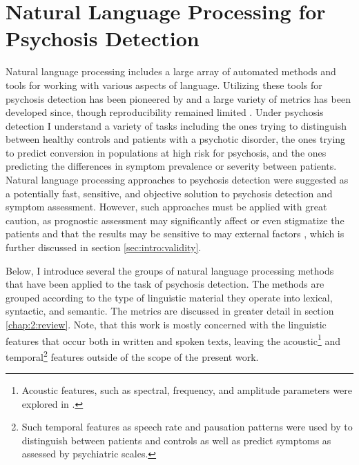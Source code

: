 \section{Natural Language Processing for Psychosis Detection}

Natural language processing includes a large array of automated methods and tools for working with various aspects of language. Utilizing these tools for psychosis detection has been pioneered by \citet{elvevaag2007quantifying} and a large variety of metrics has been developed since, though reproducibility remained limited \citep{hitczenko2021understanding, parola2022speech, fradkin2023theory}. Under psychosis detection I understand a variety of tasks including the ones trying to distinguish between healthy controls and patients with a psychotic disorder, the ones trying to predict conversion in populations at high risk for psychosis, and the ones predicting the differences in symptom prevalence or severity between patients. Natural language processing approaches to psychosis detection were suggested as a potentially fast, sensitive, and objective solution to psychosis detection and symptom assessment. However, such approaches must be applied with great caution, as  prognostic assessment may significantly affect or even stigmatize the patients and that the results may be sensitive to may external factors \citep{just2023validation}, which is further discussed in section \ref{sec:intro:validity}.

Below, I introduce several the groups of natural language processing methods that have been applied to the task of psychosis detection. The methods are grouped according to the type of linguistic material they operate into lexical, syntactic, and semantic. The metrics are discussed in greater detail in section \ref{chap:2:review}. Note, that this work is mostly concerned with the linguistic features that occur both in written and spoken texts, leaving the acoustic\footnote{Acoustic features, such as spectral, frequency, and amplitude parameters were explored in \citet{voppel2023semantic, tang2023latent, de2023acoustic, wouts2021belabbert}.} and temporal\footnote{Such temporal features as speech rate and pausation patterns were used by \citet{aich2022towards, liebenthal2022linguistic, de2023acoustic, tang2023latent} to distinguish between patients and controls as well as predict symptoms as assessed by psychiatric scales.} features outside of the scope of the present work. 

